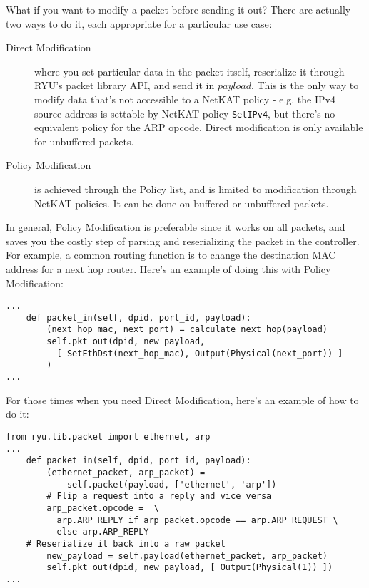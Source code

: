 What if you want to modify a packet before sending it out?  
There are actually two ways to do it, each appropriate for a particular use case:

\begin{description}
  \item[Direct Modification] where you set particular data in the packet itself, reserialize it through RYU's packet
  library API, and send it in $payload$.  
  This is the only way to modify data that's not accessible to a NetKAT policy - e.g. the IPv4 source address is
  settable by NetKAT policy \texttt{SetIPv4}, but there's no equivalent policy for the ARP opcode.  
  Direct modification is only available for unbuffered packets.
  \item[Policy Modification] is achieved through the Policy list, and is limited to modification through NetKAT
  policies.
  It can be done on buffered or unbuffered packets.
\end{description}

In general, Policy Modification is preferable since it works on all packets, and saves you the costly step of parsing and 
reserializing the packet in the controller.
For example, a common routing function is to change the destination MAC address for a next hop router.
Here's an example of doing this with Policy Modification:

\begin{lstlisting}
...
    def packet_in(self, dpid, port_id, payload):
        (next_hop_mac, next_port) = calculate_next_hop(payload)
        self.pkt_out(dpid, new_payload, 
          [ SetEthDst(next_hop_mac), Output(Physical(next_port)) ]
        )	
...
\end{lstlisting}

For those times when you need Direct Modification, here's an example of how to do it:

\begin{lstlisting}
from ryu.lib.packet import ethernet, arp
...
    def packet_in(self, dpid, port_id, payload):
        (ethernet_packet, arp_packet) = 
        	self.packet(payload, ['ethernet', 'arp'])
        # Flip a request into a reply and vice versa
        arp_packet.opcode =  \ 
          arp.ARP_REPLY if arp_packet.opcode == arp.ARP_REQUEST \
          else arp.ARP_REPLY
	# Reserialize it back into a raw packet
        new_payload = self.payload(ethernet_packet, arp_packet)
        self.pkt_out(dpid, new_payload, [ Output(Physical(1)) ])	
...
\end{lstlisting}

